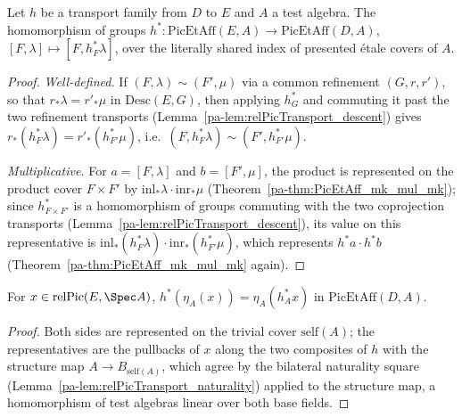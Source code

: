 \begin{definition}
  \label{pa-def:PicEtAffTransport}
  \leanok

  Let \(h\) be a transport family from \(D\) to \(E\) and \(A\) a test algebra. The
  homomorphism of groups
  \(h^{*} \colon \mathrm{PicEtAff}(E, A) \to \mathrm{PicEtAff}(D, A)\),
  \([F, \lambda] \mapsto [F, h_F^{*}\lambda]\), over the literally shared index of
  presented \'etale covers of \(A\).
\end{definition}
\begin{proof}
  \leanok
  \emph{Well-defined.} If \((F, \lambda) \sim (F', \mu)\) via a common refinement
  \((G, r, r')\), so that \(r_{*}\lambda = r'_{*}\mu\) in \(\mathrm{Desc}(E, G)\), then
  applying \(h_G^{*}\) and commuting it past the two refinement transports
  (Lemma~\ref{pa-lem:relPicTransport_descent}) gives
  \(r_{*}(h_F^{*}\lambda) = r'_{*}(h_{F'}^{*}\mu)\), i.e.\
  \((F, h_F^{*}\lambda) \sim (F', h_{F'}^{*}\mu)\).

  \emph{Multiplicative.} For \(a = [F, \lambda]\) and \(b = [F', \mu]\), the product is
  represented on the product cover \(F \times F'\) by
  \(\mathrm{inl}_{*}\lambda \cdot \mathrm{inr}_{*}\mu\)
  (Theorem~\ref{pa-thm:PicEtAff_mk_mul_mk}); since \(h_{F \times F'}^{*}\) is a homomorphism
  of groups commuting with the two coprojection transports
  (Lemma~\ref{pa-lem:relPicTransport_descent}), its value on this representative is
  \(\mathrm{inl}_{*}(h_F^{*}\lambda) \cdot \mathrm{inr}_{*}(h_{F'}^{*}\mu)\), which
  represents \(h^{*}a \cdot h^{*}b\) (Theorem~\ref{pa-thm:PicEtAff_mk_mul_mk} again).
\end{proof}

\begin{theorem}
  \label{pa-thm:PicEtAffTransport_unit}
  \leanok

  For \(x \in \mathrm{relPic}(E, \Spec A)\),
  \(h^{*}(\eta_A(x)) = \eta_A(h_A^{*} x)\) in \(\mathrm{PicEtAff}(D, A)\).
\end{theorem}
\begin{proof}
  \leanok
  Both sides are represented on the trivial cover \(\mathrm{self}(A)\); the representatives
  are the pullbacks of \(x\) along the two composites of \(h\) with the structure map
  \(A \to B_{\mathrm{self}(A)}\), which agree by the bilateral naturality square
  (Lemma~\ref{pa-lem:relPicTransport_naturality}) applied to the structure map, a
  homomorphism of test algebras linear over both base fields.
\end{proof}

